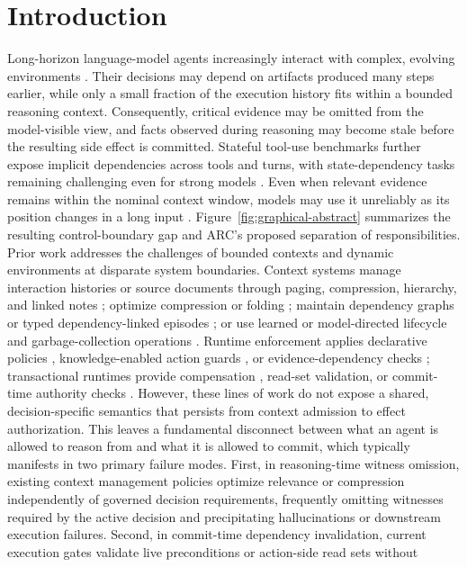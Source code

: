\section{Introduction}
Long-horizon language-model agents increasingly interact with complex, evolving environments \cite{react,taubench}.
Their decisions may depend on artifacts produced many steps earlier, while only a small fraction of the execution history fits within
a bounded reasoning context. Consequently, critical evidence may be omitted from the model-visible view,
and facts observed during reasoning may become stale before the resulting side effect is committed.
Stateful tool-use benchmarks further expose implicit dependencies across tools and turns, with state-dependency tasks remaining challenging even for strong models \cite{toolsandbox}.
Even when relevant evidence remains within the nominal context window, models may use it unreliably as its position changes in a long input \cite{lostmiddle}.
Figure~\ref{fig:graphical-abstract} summarizes the resulting control-boundary gap and ARC's proposed separation of responsibilities.
Prior work addresses the challenges of bounded contexts and dynamic environments at disparate system boundaries.
Context systems manage interaction histories or source documents through paging, compression, hierarchy, and linked notes \cite{memgpt,readagent,hiagent,amem};
optimize compression or folding \cite{acon,agentfold}; maintain dependency graphs \cite{contextweaver} or typed dependency-linked episodes \cite{cwl};
or use learned or model-directed lifecycle and garbage-collection operations \cite{mem1,selfgc,vista}.
Runtime enforcement applies declarative policies \cite{agentspec,forge}, knowledge-enabled action guards \cite{guardagent}, or evidence-dependency checks \cite{groundedcontinuation};
transactional runtimes provide compensation \cite{sagallm,atomix}, read-set validation, or commit-time authority checks \cite{sbus,committimeauth}.
However, these lines of work do not expose a shared, decision-specific semantics that
persists from context admission to effect authorization.
This leaves a fundamental disconnect between what an agent is allowed to reason from and what it is allowed to commit,
which typically manifests in two primary failure modes. First, in reasoning-time witness omission,
existing context management policies optimize relevance or compression independently of governed decision requirements,
frequently omitting witnesses required by the active decision and precipitating hallucinations or downstream execution failures.
Second, in commit-time dependency invalidation, current execution gates validate live preconditions or action-side read sets without
